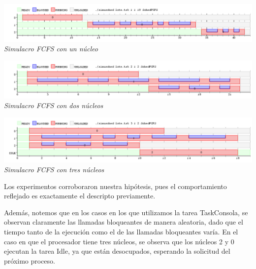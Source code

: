 \vspace{\baselineskip}
\begin{center}
\includegraphics[scale=0.45]{../tp1/Test/resEj2Co1.png}
\\
\vspace{1pt}
\footnotesize\textit{Simulacro FCFS con un n\'ucleo}
\end{center}
\vspace{\baselineskip}


\vspace{\baselineskip}
\begin{center}
\includegraphics[scale=0.45]{../tp1/Test/resEj2Co2.png}
\\
\vspace{1pt}
\footnotesize\textit{Simulacro FCFS con dos n\'ucleos}
\end{center}
\vspace{\baselineskip}

\vspace{\baselineskip}
\begin{center}
\includegraphics[scale=0.45]{../tp1/Test/resEj2Co3.png}
\\
\vspace{1pt}
\footnotesize\textit{Simulacro FCFS con tres n\'ucleos}
\end{center}
\vspace{\baselineskip}


Los experimentos corroboraron nuestra hip\'otesis, pues el comportamiento reflejado es exactamente el descripto previamente.

Adem\'as, notemos que en los casos en los que utilizamos la tarea TaskConsola, se observan claramente
las llamadas bloqueantes de manera aleatoria, dado que el tiempo tanto de la ejecuci\'on como el de las llamadas bloqueantes var\'ia.
En el caso en que el procesador tiene tres n\'ucleos, se observa que los n\'ucleos 2 y 0 ejecutan la tarea
Idle, ya que est\'an desocupados, esperando la solicitud del pr\'oximo proceso.

